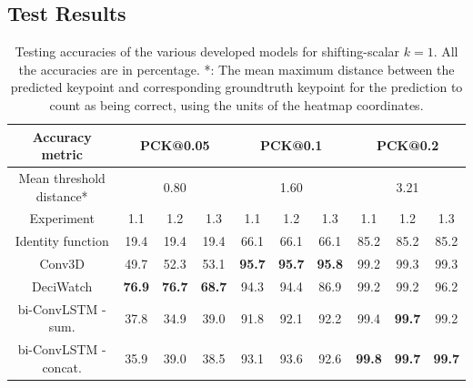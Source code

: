 \documentclass[./main.tex]{subfiles}
\begin{document}
\subsection{Test Results}
\begin{table}[htbp]
    \begin{tabular}{c||ccc|ccc|ccc}
        \hline
        Accuracy metric & \multicolumn{3}{c}{PCK@0.05} & \multicolumn{3}{c}{PCK@0.1} & \multicolumn{3}{c}{PCK@0.2} \\
        \hline
        Mean threshold distance* & \multicolumn{3}{c}{0.80} & \multicolumn{3}{c}{1.60} & \multicolumn{3}{c}{3.21} \\
        \hline
        Experiment & 1.1 & 1.2 & 1.3 & 1.1 & 1.2 & 1.3 & 1.1 & 1.2 & 1.3 \\
        \hline
        \hline
        Identity function & 19.4 & 19.4 & 19.4 & 66.1 & 66.1 & 66.1 & 85.2 & 85.2 & 85.2 \\
        Conv3D & 49.7 & 52.3 & 53.1 & \textbf{95.7} & \textbf{95.7} & \textbf{95.8} & 99.2 & 99.3 & 99.3 \\
        DeciWatch & \textbf{76.9} & \textbf{76.7} & \textbf{68.7} & 94.3 & 94.4 & 86.9 & 99.2 & 99.2 & 96.2 \\
        bi-ConvLSTM - sum. & 37.8 & 34.9 & 39.0 & 91.8 & 92.1 & 92.2 & 99.4 & \textbf{99.7} & 99.2 \\
        bi-ConvLSTM - concat. & 35.9 & 39.0 & 38.5 & 93.1 & 93.6 & 92.6 & \textbf{99.8} & \textbf{99.7} & \textbf{99.7} \\
        \hline
    \end{tabular}
    \caption{Testing accuracies of the various developed models for shifting-scalar $k = 1$. All the accuracies are in percentage. *: The mean maximum distance between the predicted keypoint and corresponding groundtruth keypoint for the prediction to count as being correct, using the units of the heatmap coordinates.}
    \label{tab:finetune_test_accs_1}
\end{table}
\end{document}
